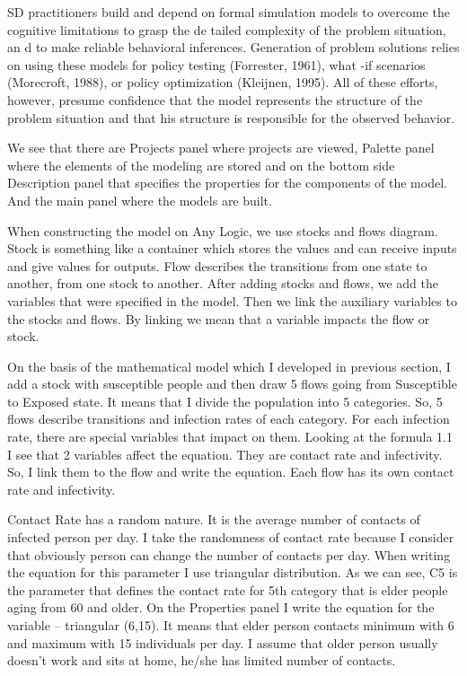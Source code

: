 SD practitioners build and depend on formal simulation models to overcome the cognitive limitations to grasp the de tailed complexity of the problem situation, an d to make reliable behavioral inferences. Generation of problem solutions relies on using these models for policy testing (Forrester, 1961), what -if scenarios (Morecroft, 1988), or policy optimization (Kleijnen, 1995). All of these efforts, however, presume confidence that the model represents the structure of the problem situation and that his structure is responsible for the observed behavior.

We see that there are Projects panel where projects are viewed, Palette panel where the elements of the modeling are stored and on the bottom side Description panel that specifies the properties for the components of the model. And the main panel where the models are built.

When constructing the model on Any Logic, we use stocks and flows diagram. Stock is something like a container which stores the values and can receive inputs and give values for outputs. Flow describes the transitions from one state to another, from one stock to another. After adding stocks and flows, we add the variables that were specified in the model. Then we link the auxiliary variables to the stocks and flows. By linking we mean that a variable impacts the flow or stock.


On the basis of the mathematical model which I developed in previous section, I add a stock with susceptible people and then draw 5 flows going from Susceptible to Exposed state.  It means that I divide the population into 5 categories. So, 5 flows describe transitions and infection rates of each category. For each infection rate, there are special variables that impact on them. Looking at the formula 1.1 I see that 2 variables affect the equation. They are contact rate and infectivity. So, I link them to the flow and write the equation. Each flow has its own contact rate and infectivity.

Contact Rate has a random nature. It is the average number of contacts of infected person per day. I take the randomness of contact rate because I consider that obviously person can change the number of contacts per day. When writing the equation for this parameter I use triangular distribution. As we can see, C5 is the parameter that defines the contact rate for 5th category that is elder people aging from 60 and older. On the Properties panel I write the equation for the variable – triangular (6,15). It means that elder person contacts minimum with 6 and maximum with 15 individuals per day. I assume that older person usually doesn’t work and sits at home, he/she has limited number of contacts.


